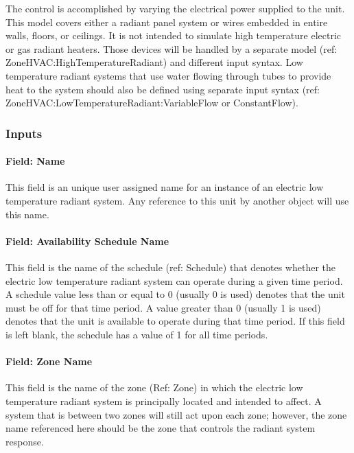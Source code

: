 The control is accomplished by varying the electrical power supplied to the unit. This model covers either a radiant panel system or wires embedded in entire walls, floors, or ceilings. It is not intended to simulate high temperature electric or gas radiant heaters. Those devices will be handled by a separate model (ref: ZoneHVAC:HighTemperatureRadiant) and different input syntax. Low temperature radiant systems that use water flowing through tubes to provide heat to the system should also be defined using separate input syntax (ref: ZoneHVAC:LowTemperatureRadiant:VariableFlow or ConstantFlow).

\subsubsection{Inputs}\label{inputs-7-019}

\paragraph{Field: Name}\label{field-name-7-015}

This field is an unique user assigned name for an instance of an electric low temperature radiant system. Any reference to this unit by another object will use this name.

\paragraph{Field: Availability Schedule Name}\label{field-availability-schedule-name-7-003}

This field is the name of the schedule (ref: Schedule) that denotes whether the electric low temperature radiant system can operate during a given time period. A schedule value less than or equal to 0 (usually 0 is used) denotes that the unit must be off for that time period. A value greater than 0 (usually 1 is used) denotes that the unit is available to operate during that time period. If this field is left blank, the schedule has a value of 1 for all time periods.

\paragraph{Field: Zone Name}\label{field-zone-name-2-005}

This field is the name of the zone (Ref: Zone) in which the electric low temperature radiant system is principally located and intended to affect. A system that is between two zones will still act upon each zone; however, the zone name referenced here should be the zone that controls the radiant system response.

